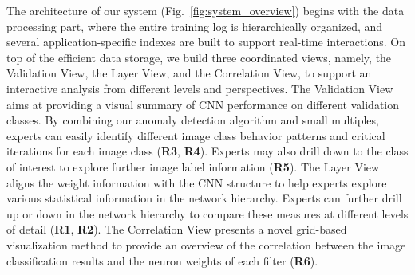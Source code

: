 \documentclass[format=acmsmall, review=false, screen=true]{acmart}
\begin{document}
The architecture of our system (Fig.~\ref{fig:system_overview}) begins with the data processing part, where the entire training log is hierarchically organized, and several application-specific indexes are built to support real-time interactions.
On top of the efficient data storage, we build three coordinated views, namely, the Validation View, the Layer View, and the Correlation View, to support an interactive analysis from different levels and perspectives.
The Validation View aims at providing a visual summary of CNN performance on different validation classes. 
By combining our anomaly detection algorithm and small multiples, experts can easily identify different image class behavior patterns and critical iterations for each image class (\textbf{R3}, \textbf{R4}). 
Experts may also drill down to the class of interest to explore further image label information (\textbf{R5}).  
The Layer View aligns the weight information with the CNN structure to help experts explore various statistical information in the network hierarchy. 
Experts can further drill up or down in the network hierarchy to compare these measures at different levels of detail (\textbf{R1}, \textbf{R2}).
The Correlation View presents a novel grid-based visualization method to provide an overview of the correlation between the image classification results and the neuron weights of each filter (\textbf{R6}).
\end{document}
